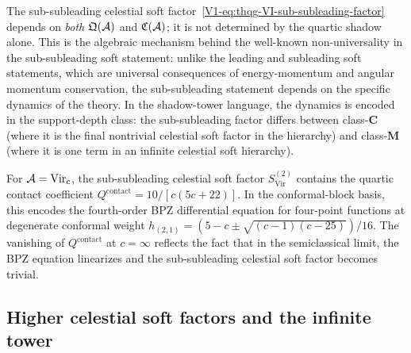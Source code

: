 \begin{remark}
The sub-subleading celestial soft factor~\eqref{V1-eq:thqg-VI-sub-subleading-factor}
depends on \emph{both} $\mathfrak{Q}(\mathcal{A})$ and
$\mathfrak{C}(\mathcal{A})$; it is not determined by the quartic shadow
alone. This is the algebraic mechanism behind the well-known
non-universality in the sub-subleading soft statement:
unlike the leading and subleading soft statements, which are universal
consequences of energy-momentum and angular momentum conservation,
the sub-subleading statement depends on the specific dynamics of the
theory. In the shadow-tower language, the dynamics is encoded in
the support-depth class: the sub-subleading factor differs
between class-$\mathbf{C}$ (where it is the final nontrivial
celestial soft factor in the hierarchy) and class-$\mathbf{M}$
(where it is one term in an infinite celestial soft hierarchy).
\end{remark}

\begin{remark}
For $\mathcal{A} = \mathrm{Vir}_c$, the sub-subleading celestial soft factor
$S^{(2)}_{\mathrm{Vir}}$ contains the quartic contact coefficient
$Q^{\mathrm{contact}} = 10/[c(5c+22)]$.
In the conformal-block basis, this encodes the fourth-order
BPZ differential equation for four-point functions at degenerate
conformal weight $h_{(2,1)} = (5-c \pm \sqrt{(c-1)(c-25)})/16$.
The vanishing of $Q^{\mathrm{contact}}$ at $c = \infty$
reflects the fact that in the semiclassical limit, the BPZ
equation linearizes and the sub-subleading celestial soft factor
becomes trivial.
\end{remark}

%
%

\subsection{Higher celestial soft factors and the infinite tower}
\label{subsec:thqg-VI-higher-soft}

